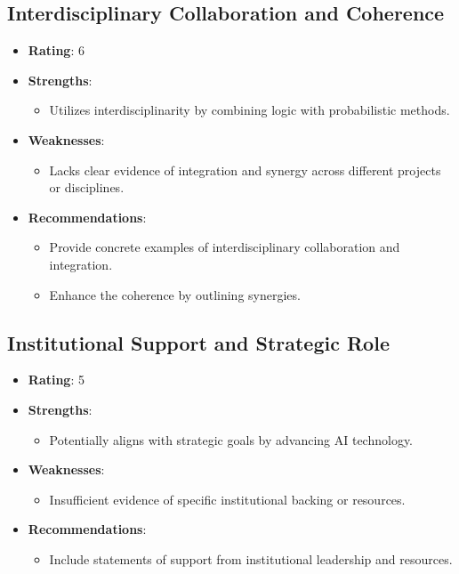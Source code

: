 \documentclass{article}
\begin{document}
\subsection{Interdisciplinary Collaboration and Coherence}
\begin{itemize}
    \item \textbf{Rating}: 6
    \item \textbf{Strengths}: 
    \begin{itemize}
        \item Utilizes interdisciplinarity by combining logic with probabilistic methods.
    \end{itemize}
    \item \textbf{Weaknesses}: 
    \begin{itemize}
        \item Lacks clear evidence of integration and synergy across different projects or disciplines.
    \end{itemize}
    \item \textbf{Recommendations}: 
    \begin{itemize}
        \item Provide concrete examples of interdisciplinary collaboration and integration.
        \item Enhance the coherence by outlining synergies.
    \end{itemize}
\end{itemize}

\subsection{Institutional Support and Strategic Role}
\begin{itemize}
    \item \textbf{Rating}: 5
    \item \textbf{Strengths}: 
    \begin{itemize}
        \item Potentially aligns with strategic goals by advancing AI technology.
    \end{itemize}
    \item \textbf{Weaknesses}: 
    \begin{itemize}
        \item Insufficient evidence of specific institutional backing or resources.
    \end{itemize}
    \item \textbf{Recommendations}: 
    \begin{itemize}
        \item Include statements of support from institutional leadership and resources.
    \end{itemize}
\end{itemize}
\end{document}
